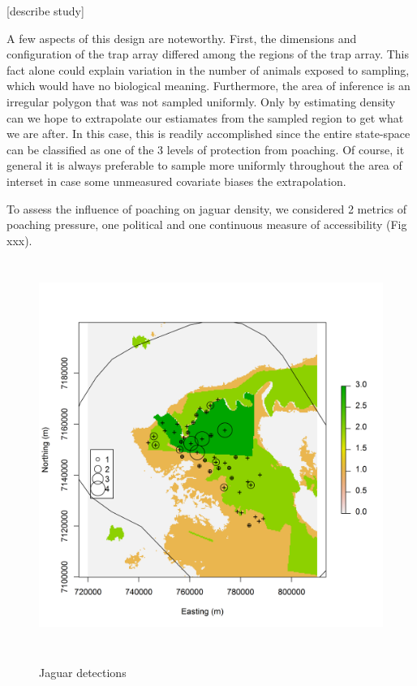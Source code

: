 [describe study]

A few aspects of this design are noteworthy. First, the dimensions and
configuration of the trap array differed among the regions of the trap
array. This fact alone could explain variation in the number of
animals exposed to sampling, which would have no biological
meaning. Furthermore, the area of inference is an irregular polygon
that was not sampled uniformly. Only by estimating density can we hope
to extrapolate our estiamates from the sampled region to get what we
are after. In this case, this is readily accomplished since the entire
state-space can be classified as one of the 3 levels of protection
from poaching. Of course, it general it is always preferable to sample
more uniformly throughout the area of interset in case some unmeasured
covariate biases the extrapolation.

To assess the influence of poaching on jaguar density, we considered 2
metrics of poaching pressure, one political and one continuous measure
of accessibility (Fig xxx).









\begin{figure}
\centering
\includegraphics[width=5in,height=5in]{figs/jaguarCountMap}
\label{ch9:fig:jaguarCts}
\caption{Jaguar detections}
\end{figure}





